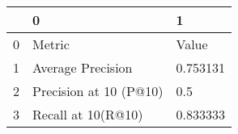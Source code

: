 \begin{tabular}{lll}
\toprule
{} &                       0 &         1 \\
\midrule
0 &                  Metric &     Value \\
1 &       Average Precision &  0.753131 \\
2 &  Precision at 10 (P@10) &       0.5 \\
3 &      Recall at 10(R@10) &  0.833333 \\
\bottomrule
\end{tabular}
